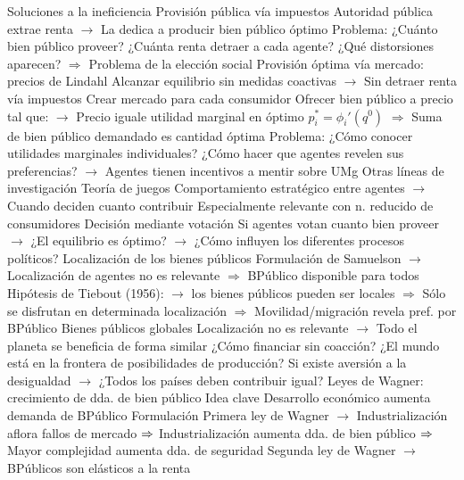 \documentclass{nuevotema}
\begin{document}
\begin{esquemal}
				\4[]
		\2 Soluciones a la ineficiencia
			\3 Provisión pública vía impuestos
				\4 Autoridad pública extrae renta
				\4[] $\to$ La dedica a producir bien público óptimo
				\4 Problema:
				\4[] ¿Cuánto bien público proveer?
				\4[] ¿Cuánta renta detraer a cada agente?
				\4[] ¿Qué distorsiones aparecen?
				\4[] $\Rightarrow$ Problema de la elección social
			\3 Provisión óptima vía mercado: precios de Lindahl
				\4 Alcanzar equilibrio sin medidas coactivas
				\4[] $\to$ Sin detraer renta vía impuestos
				\4 Crear mercado para cada consumidor
				\4[] Ofrecer bien público a precio tal que:
				\4[] $\to$ Precio iguale utilidad marginal en óptimo
				\4[] $p_i^* = \phi_i'(q^0)$
				\4[] $\Rightarrow$ Suma de bien público demandado es cantidad óptima
				\4 Problema:
				\4[] ¿Cómo conocer utilidades marginales individuales?
				\4[] ¿Cómo hacer que agentes revelen sus preferencias?
				\4[] $\to$ Agentes tienen incentivos a mentir sobre UMg
			\3 Otras líneas de investigación
				\4 Teoría de juegos
				\4[] Comportamiento estratégico entre agentes
				\4[] $\to$ Cuando deciden cuanto contribuir
				\4[] Especialmente relevante con n. reducido de consumidores
				\4 Decisión mediante votación
				\4[] Si agentes votan cuanto bien proveer
				\4[] $\to$ ¿El equilibrio es óptimo?
				\4[] $\to$ ¿Cómo influyen los diferentes procesos políticos?
				\4 Localización de los bienes públicos
				\4[] Formulación de Samuelson
				\4[] $\to$ Localización de agentes no es relevante
				\4[] $\Rightarrow$ BPúblico disponible para todos
				\4[] Hipótesis de Tiebout (1956):
				\4[] $\to$ los bienes públicos pueden ser locales
				\4[] $\Rightarrow$ Sólo se disfrutan en determinada localización
				\4[] $\Rightarrow$ Movilidad/migración revela pref. por BPúblico
				\4 Bienes públicos globales
				\4[] Localización no es relevante
				\4[] $\to$ Todo el planeta se beneficia de forma similar
				\4[] ¿Cómo financiar sin coacción?
				\4[] ¿El mundo está en la frontera de posibilidades de producción?
				\4[] Si existe aversión a la desigualdad
				\4[] $\to$ ¿Todos los países deben contribuir igual?
			\3 Leyes de Wagner: crecimiento de dda. de bien público
				\4 Idea clave
				\4[] Desarrollo económico aumenta demanda de BPúblico
				\4 Formulación
				\4[] Primera ley de Wagner
				\4[] $\to$ Industrialización aflora fallos de mercado
				\4[] $\Rightarrow$ Industrialización aumenta dda. de bien público
				\4[] $\Rightarrow$ Mayor complejidad aumenta dda. de seguridad
				\4[] Segunda ley de Wagner
				\4[] $\to$ BPúblicos son elásticos a la renta

\end{esquemal}
\end{document}
